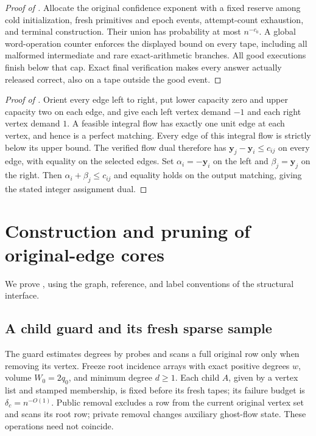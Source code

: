 \documentclass[11pt]{article}
\theoremstyle{remark}
\newcommand{\yy}{\mathbf y}
\begin{document}
\begin{proof}[Proof of ]
Allocate the original confidence exponent with a fixed reserve among cold
initialization, fresh primitives and epoch events, attempt-count exhaustion, and
terminal construction.
Their union has probability at most $n^{-c_0}$.
A global word-operation counter enforces the displayed bound on every tape,
including all malformed intermediate and rare exact-arithmetic branches.
All good executions finish below that cap.
Exact final verification makes every answer actually released correct, also on a
tape outside the good event.
\end{proof}

\begin{proof}[Proof of ]
Orient every edge left to right, put lower capacity zero and upper capacity two
on each edge, and give each left vertex demand $-1$ and each right vertex demand
$1$.
A feasible integral flow has exactly one unit edge at each vertex, and hence is
a perfect matching.
Every edge of this integral flow is strictly below its upper bound.
The verified flow dual therefore has $\yy_j-\yy_i\le c_{ij}$ on every edge, with
equality on the selected edges.
Set $\alpha_i=-\yy_i$ on the left and $\beta_j=\yy_j$ on the right.
Then $\alpha_i+\beta_j\le c_{ij}$ and equality holds on the output matching,
giving the stated integer assignment dual.
\end{proof}





\appendix
\section{Construction and pruning of original-edge cores}
\label{sec:ram27-core-proof}
We prove , using the graph, reference, and label
conventions of the structural interface.

\subsection{A child guard and its fresh sparse sample}

The guard estimates degrees by probes and scans a full original row only when
removing its vertex.
Freeze root incidence arrays with exact positive degrees $w$, volume $W_0=2q_0$,
and minimum degree $d\ge1$.
Each child $A$, given by a vertex list and stamped membership, is fixed before
its fresh tapes; its failure budget is $\delta_c=n^{-O(1)}$.
Public removal excludes a row from the current original vertex set and scans its
root row; private removal changes auxiliary ghost-flow state.
These operations need not coincide.
\end{document}
